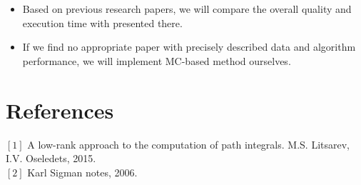 \documentclass[11pt,a4paper]{extarticle}
\begin{document}
\begin{itemize}
    
    \item Based on previous research papers, we will compare the overall quality and execution time with presented there.
    
    \item If we find no appropriate paper with precisely described data and algorithm performance, we will implement MC-based method ourselves.
    
\end{itemize}


\section{References}
     $[1]$  A low-rank approach to the computation of path integrals. M.S. Litsarev, I.V. Oseledets, 2015.\\
    $[2]$ Karl Sigman notes, 2006.\\

    


			
		
\end{document}
